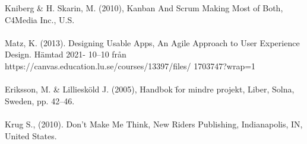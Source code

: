 \documentclass[12pt]{article}
\begin{document}
\noindent
[2] Kniberg \& H. Skarin, M. (2010), Kanban And Scrum Making Most of Both, C4Media Inc., U.S. \\\\
\noindent
[3] Matz, K. (2013). Designing Usable Apps, An Agile Approach to User Experience Design. Hämtad 2021-
10–10 från https://canvas.education.lu.se/courses/13397/files/
1703747?wrap=1 \\\\
\noindent
[4] Eriksson, M. \& Lilliesköld J. (2005), Handbok f̈or mindre projekt, Liber, Solna, Sweden, pp. 42–46. \\\\

\noindent
[5] Krug S., (2010). Don’t Make Me Think, New Riders Publishing, Indianapolis, IN, United States. \\\\



\end{document}
